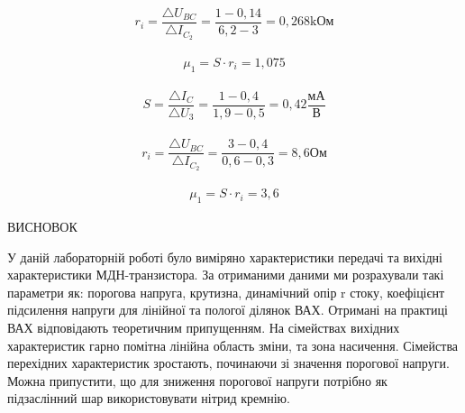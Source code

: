 \documentclass[a4paper,14pt]{extreport}
\begin{document}
\begin{align}\label{q2}
  r_i = \dfrac{\triangle U_{BC}}{\triangle I_{C_2}} =\dfrac{1-0,14}{6,2-3} = 0,268 \text{kОм}
\end{align}

\begin{align}\label{q3}
  \mu_1 = S\cdot r_i = 1,075
\end{align}

\begin{align}\label{q4}
  S = \dfrac{\triangle I_C}{\triangle U_{\text{3}}} = \dfrac{1-0,4}{1,9-0,5}= 0,42 \dfrac{\text{мА}}{\text{В}}
\end{align}

\begin{align}\label{q5}
  r_i = \dfrac{\triangle U_{BC}}{\triangle I_{C_2}} = \dfrac{3-0,4}{0,6-0,3}= 8,6 \text{Ом}
\end{align}

\begin{align}\label{q6}
  \mu_1 = S\cdot r_i = 3,6
\end{align}





\newpage
\begin{center} ВИСНОВОК \end{center}
У даній лабораторній роботі було виміряно характеристики передачі та вихідні характеристики МДН-транзистора. За отриманими даними ми розрахували такі параметри як: порогова напруга, крутизна, динамічний опір r стоку, коефіцієнт підсилення напруги для лінійної та пологої ділянок ВАХ. Отримані на практиці ВАХ відповідають теоретичним припущенням. На сімействах вихідних характеристик гарно помітна лінійна область зміни, та зона насичення. Сімейства перехідних характеристик зростають, починаючи зі значення порогової напруги. Можна припустити, що для зниження порогової напруги потрібно як підзаслінний шар використовувати нітрид кремнію.





\end{document}

